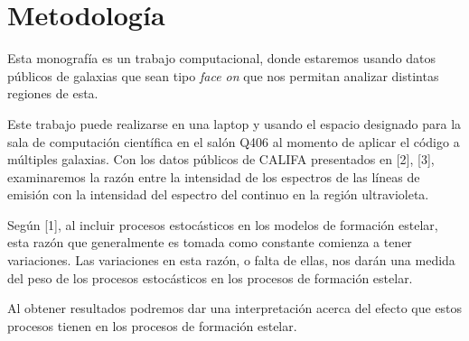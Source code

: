 \documentclass[12pt]{article}
\begin{document}
\section{Metodolog\'ia}



Esta monograf\'ia es un trabajo computacional, donde estaremos usando datos p\'ublicos de galaxias que sean tipo
\textit{face on} que nos permitan analizar distintas regiones de esta.
%
%

Este trabajo puede realizarse en una laptop y usando el espacio designado para la sala de computaci\'on cient\'ifica en el sal\'on
Q406 al momento de aplicar el c\'odigo a m\'ultiples galaxias. Con los datos p\'ublicos de CALIFA presentados en [2], [3],
examinaremos la raz\'on entre la intensidad de los espectros de las  l\'ineas de emisi\'on con la intensidad del espectro del
continuo en la regi\'on ultravioleta.
%
%

Seg\'un [1], al incluir procesos estoc\'asticos en los modelos de formaci\'on estelar, esta raz\'on que generalmente es tomada
como constante comienza a tener variaciones. Las variaciones en esta raz\'on, o falta de ellas, nos dar\'an una medida del peso de
 los procesos estoc\'asticos en los procesos de formaci\'on estelar.
%
%

Al obtener resultados podremos dar una interpretaci\'on acerca del efecto que estos procesos tienen en los procesos de formaci\'on
 estelar.
%
\end{document}
